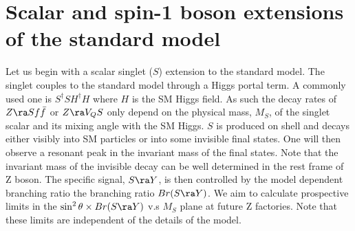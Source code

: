 \documentclass[11pt]{article}
\begin{document}
\section{Scalar and spin-1 boson extensions of the standard model}\label{sec:models}


Let us begin with a scalar singlet ($S$) extension to the standard model. The singlet couples to the standard model through a Higgs portal term. A commonly used one is  $S^\dagger S H^\dagger H$ where  $H$ is the SM Higgs field. As such the decay rates of $Z\ra S f\bar{f}$ or $Z\ra V_Q S$ only depend on the physical mass, $M_S$, of the singlet scalar and its mixing angle with the SM Higgs.
 $S$ is produced on shell and decays either visibly into SM particles or into some invisible final states.
One will then observe a resonant peak in the invariant mass of the final states. Note that the invariant mass of the invisible decay can be well determined in the rest frame of Z boson.
The specific signal, $S\ra Y$, is then controlled by the model dependent branching ratio the branching ratio $Br(S\ra Y)$.
We aim to calculate prospective limits in the $\sin^2\theta \times Br(S\ra Y)$ v.s $M_S$ plane at future Z factories.
Note that these limits are independent of the details of the model.
\end{document}
